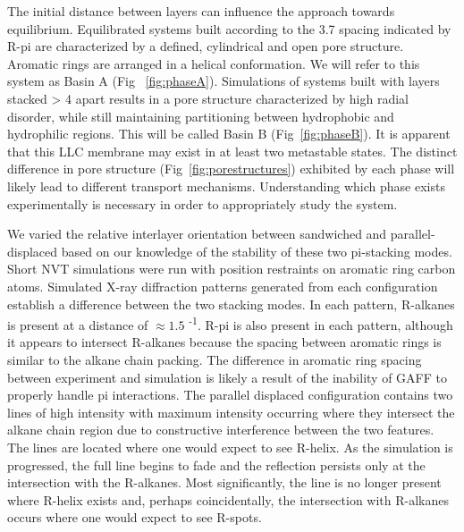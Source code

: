 The initial distance between layers can influence the approach towards
equilibrium. Equilibrated systems built according to the 3.7 \angstrom
spacing indicated by R-pi are characterized by a defined, cylindrical and
open pore structure. Aromatic rings are arranged in a helical conformation.
We will refer to this system as Basin A (Fig ~\ref{fig:phaseA}). Simulations
of systems built with layers stacked > 4 \angstrom apart results in a pore
structure characterized by high radial disorder, while still maintaining 
partitioning between hydrophobic and hydrophilic regions. This will be 
called Basin B (Fig~\ref{fig:phaseB}). It is apparent that this LLC membrane
may exist in at least two metastable states. The distinct difference in 
pore structure (Fig~\ref{fig:porestructures}) exhibited by each phase will
likely lead to different transport mechanisms. Understanding which phase 
exists experimentally is necessary in order to appropriately study the system.

We varied the relative interlayer orientation between sandwiched and 
parallel-displaced based on our knowledge of the stability of these two
pi-stacking modes. Short NVT simulations were run with position restraints
on aromatic ring carbon atoms. Simulated X-ray diffraction patterns 
generated from each configuration establish a difference between the two
stacking modes. In each pattern, R-alkanes is present at a distance of
$\approx 1.5$ \angstrom \textsuperscript{-1}. R-pi is also present in each 
pattern, although it appears to intersect R-alkanes because the spacing
between aromatic rings is similar to the alkane chain packing. The difference 
in aromatic ring spacing between experiment and simulation is likely a result
of the inability of GAFF to properly handle pi interactions. The parallel
displaced configuration contains two lines of high intensity with maximum
intensity occurring where they intersect the alkane chain region due to
constructive interference between the two features. The lines are located
where one would expect to see R-helix. As the simulation is progressed, 
the full line begins to fade and the reflection persists only at the 
intersection with the R-alkanes. Most significantly, the line is no
longer present where R-helix exists and, perhaps coincidentally, the 
intersection with R-alkanes occurs where one would expect to see R-spots.

